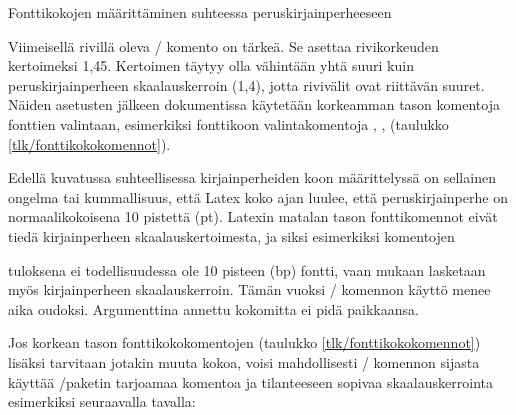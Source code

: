 \begin{esimerkki*}

  \caption{Fonttikokojen määrittäminen suhteessa peruskirjainperheeseen}
  \label{esim/fontti-suhteellinen}
\end{esimerkki*}

Viimeisellä rivillä oleva \-/ komento on tärkeä. Se
asettaa rivikorkeuden kertoimeksi 1,45. Kertoimen täytyy olla vähintään
yhtä suuri kuin peruskirjainperheen skaalauskerroin (1,4), jotta
rivivälit ovat riittävän suuret. Näiden asetusten jälkeen dokumentissa
käytetään korkeamman tason komentoja fonttien valintaan, esimerkiksi
fonttikoon valintakomentoja , ,
 (taulukko \ref{tlk/fonttikokokomennot}).

Edellä kuvatussa suhteellisessa kirjainperheiden koon määrittelyssä on
sellainen ongelma tai kummallisuus, että Latex koko ajan luulee, että
peruskirjainperhe on normaalikokoisena 10 pistettä (pt). Latexin matalan
tason fonttikomennot eivät tiedä kirjainperheen skaalauskertoimesta, ja
siksi esimerkiksi komentojen

\begin{koodilohkosis}
\fontsize{10bp}{12bp} \selectfont
\end{koodilohkosis}

\noindent
tuloksena ei todellisuudessa ole 10 pisteen (bp) fontti, vaan mukaan
lasketaan myös kirjainperheen skaalauskerroin. Tämän vuoksi
\-/ komennon käyttö menee aika oudoksi. Argumenttina
annettu kokomitta ei pidä paikkaansa.

Jos korkean tason fonttikokokomentojen (taulukko
\ref{tlk/fonttikokokomennot}) lisäksi tarvitaan jotakin muuta kokoa,
voisi mahdollisesti \-/ komennon sijasta käyttää
\-/paketin tarjoamaa komentoa ja tilanteeseen sopivaa
skaalauskerrointa esimerkiksi seuraavalla tavalla:

